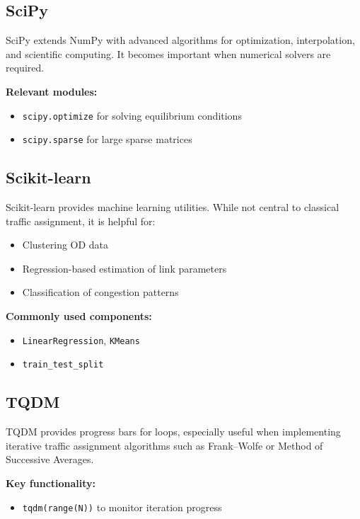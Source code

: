 \documentclass{rapportCS} %
\begin{document}
\subsection{SciPy}
SciPy extends NumPy with advanced algorithms for optimization, interpolation, and scientific computing. It becomes important when numerical solvers are required.

\textbf{Relevant modules:}
\begin{itemize}
    \item \texttt{scipy.optimize} for solving equilibrium conditions
    \item \texttt{scipy.sparse} for large sparse matrices
\end{itemize}

\subsection{Scikit-learn}
Scikit-learn provides machine learning utilities. While not central to classical traffic assignment, it is helpful for:
\begin{itemize}
    \item Clustering OD data
    \item Regression-based estimation of link parameters
    \item Classification of congestion patterns
\end{itemize}

\textbf{Commonly used components:}
\begin{itemize}
    \item \texttt{LinearRegression}, \texttt{KMeans}
    \item \texttt{train\_test\_split}
\end{itemize}

\subsection{TQDM}
TQDM provides progress bars for loops, especially useful when implementing iterative traffic assignment algorithms such as Frank–Wolfe or Method of Successive Averages.

\textbf{Key functionality:}
\begin{itemize}
    \item \texttt{tqdm(range(N))} to monitor iteration progress
\end{itemize}

\end{document}
